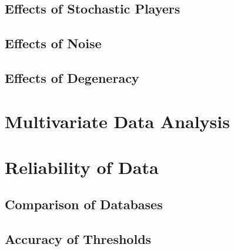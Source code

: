 \subsection{Effects of Stochastic Players}\label{subsec:Effects_of_Stochastic_Players}

\subsection{Effects of Noise}\label{subsec:Effects_of_Noise}

\subsection{Effects of Degeneracy}\label{subsec:Effects_of_Degeneracy}

\section{Multivariate Data Analysis}\label{sec:MV_Data_Analysis}

\section{Reliability of Data}\label{sec:Reliability_of_Data}

\subsection{Comparison of Databases}\label{subsec:Comparison_of_Databases}

\subsection{Accuracy of Thresholds}\label{subsec:Accuracy_of_Thresholds}
